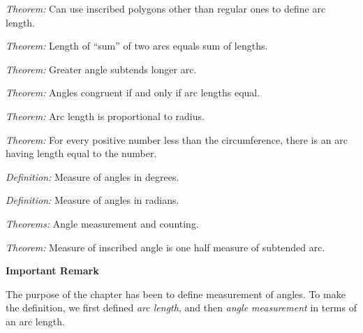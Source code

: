 \documentclass[11pt]{book}
\begin{document}
\begin{exercisecols}
\noindent\emph{Theorem:} Can use inscribed polygons other than regular ones to
define arc length.

\noindent\emph{Theorem:} Length of ``sum'' of two arcs equals sum of lengths.

\noindent\emph{Theorem:} Greater angle subtends longer arc.

\noindent\emph{Theorem:} Angles congruent if and only if arc lengths equal.

\noindent\emph{Theorem:} Arc length is proportional to radius.

\noindent\emph{Theorem:} For every positive number less than the circumference,
there is an arc having length equal to the number.

\noindent\emph{Definition:} Measure of angles in degrees.

\noindent\emph{Definition:} Measure of angles in radians.

\noindent\emph{Theorems:} Angle measurement and counting.

\noindent\emph{Theorem:} Measure of inscribed angle is one half measure of
subtended arc.

\par\medskip
\begin{center}\bfseries Important Remark\end{center}
\nopagebreak

The purpose of the chapter has been to define measurement of angles. To make the
definition, we first defined \emph{arc length}, and then \emph{angle
measurement} in terms of an arc length.


\end{exercisecols}
\end{document}

